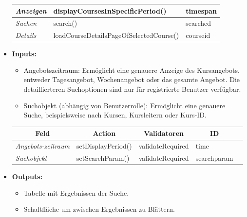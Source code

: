 \begin{itemize}
\begin{center}
\begin{longtable}{|p{2cm} |p{9cm} | p{4cm}|}
					\textit{Anzeigen} & displayCoursesInSpecificPeriod() & timespan\\ \hline
					\textit{Suchen} &  search() & searched\\ \hline
					\textit{Details} & loadCourseDetailsPageOfSelectedCourse() & courseid\\ \hline
				\end{longtable}
			\end{center}
			\item \textbf{Inputs:}
			\begin{itemize}
				\item Angebotszeitraum: Ermöglicht eine genauere Anzeige des Kursangebots, entweder Tagesangebot, Wochenangebot oder das gesamte Angebot. Die detaillierteren Suchoptionen sind nur für registrierte Benutzer verfügbar.
				\item Suchobjekt (abhängig von Benutzerrolle): Ermöglicht eine genauere Suche, beispielsweise nach Kursen, Kursleitern oder Kurs-ID.
			\end{itemize}
				\begin{center}
					\begin{longtable}{|p{3cm} |p{4cm} | p{4cm}|p{3cm} |p{2cm}|}
						
						\hline \multicolumn{1}{|c|}{\textbf{Feld}} & \multicolumn{1}{|c|}{\textbf{Action}} & \multicolumn{1}{|c|}{\textbf{Validatoren}}  &  \multicolumn{1}{|c|}{\textbf{ID}} \\ \hline
						\endfirsthead
						\hline
						\endlastfoot
						\textit{Angebots-zeitraum} & setDisplayPeriod() & validateRequired & time\\ \hline
						\textit{Suchobjekt} & setSearchParam() & validateRequired & searchparam\\ \hline
					\end{longtable}
				\end{center}
			\item \textbf{Outputs:}
			\begin{itemize}
				\item Tabelle mit Ergebnissen der Suche.
				\item Schaltfläche um zwischen Ergebnissen zu Blättern.
			\end{itemize}
					\begin{center}
						\begin{longtable}{|p{5cm} | p{4cm}|p{3cm}|}
							

\end{longtable}
\end{center}
\end{itemize}
